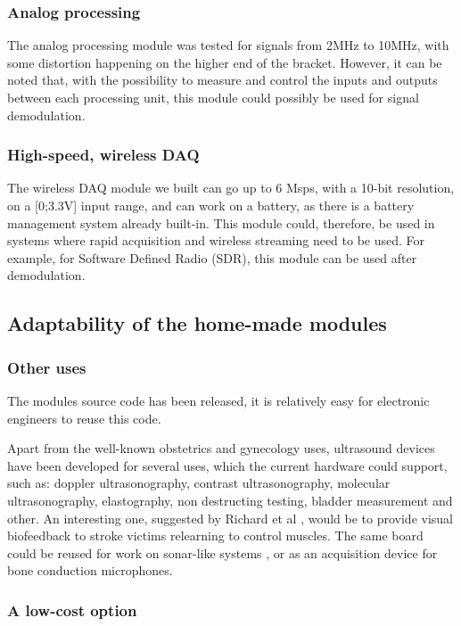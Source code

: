 \documentclass[letterpaper, 10 pt, conference]{ieeeconf} %
\begin{document}
\subsubsection{Analog processing}

The analog processing module was tested for signals from 2MHz to 10MHz, with some distortion happening on the higher end of the bracket. However, it can be noted that, with the possibility to measure and control the inputs and outputs between each processing unit, this module could possibly be used for signal demodulation.

\subsubsection{High-speed, wireless DAQ}

The wireless DAQ module we built can go up to 6 Msps, with a 10-bit resolution, on a [0;3.3V] input range, and can work on a battery, as there is a battery management system already built-in. This module could, therefore, be used in systems where rapid acquisition and wireless streaming need to be used. For example, for Software Defined Radio (SDR), this module can be used after demodulation.

\subsection{Adaptability of the home-made modules}

\subsubsection{Other uses}

The modules source code has been released, it is relatively easy for electronic engineers to reuse this code. 

Apart from the well-known obstetrics and gynecology uses, ultrasound devices have been developed for several uses, which the current hardware could support, such as: doppler ultrasonography, contrast ultrasonography, molecular ultrasonography, elastography, non destructing testing, bladder measurement and other. An interesting one, suggested by Richard et al \cite{c3}, would be to provide visual biofeedback to stroke victims relearning to control muscles. The same board could be reused for work on sonar-like systems \cite{c14}, or as an acquisition device for bone conduction microphones.

\subsubsection{A low-cost option}
\end{document}
